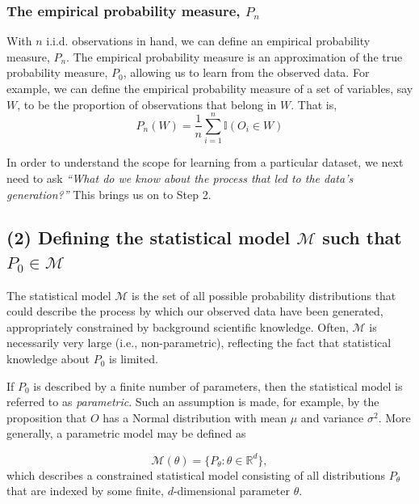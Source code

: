 \documentclass[
  12pt, krantz2,
]{krantz}
\newcommand{\R}{\mathbb{R}}
\newcommand{\M}{\mathcal{M}}
\newcommand{\I}{\mathbb{I}}
\newcommand{\1}{\mathbbm{1}}
\theoremstyle{definition}
\theoremstyle{definition}
\theoremstyle{definition}
\theoremstyle{definition}
\theoremstyle{remark}
\begin{document}
\hypertarget{the-empirical-probability-measure-p_n}{%
\subsubsection*{\texorpdfstring{The empirical probability measure, \(P_n\)}{The empirical probability measure, P\_n}}\label{the-empirical-probability-measure-p_n}}


With \(n\) i.i.d. observations in hand, we can define an empirical probability
measure, \(P_n\). The empirical probability measure is an approximation of the
true probability measure, \(P_0\), allowing us to learn from the observed data.
For example, we can define the empirical probability measure of a set of
variables, say \(W\), to be the proportion of observations that belong in \(W\).
That is,
\begin{equation*}
  P_n(W) = \frac{1}{n}\sum_{i=1}^{n} \I(O_i \in W)
\end{equation*}

In order to understand the scope for learning from a particular dataset, we next
need to ask \emph{``What do we know about the process that led to the data's
generation?''} This brings us on to Step 2.

\hypertarget{defining-the-statistical-model-m-such-that-p_0-in-m}{%
\subsection*{\texorpdfstring{(2) Defining the statistical model \(\M\) such that \(P_0 \in \M\)}{(2) Defining the statistical model \textbackslash M such that P\_0 \textbackslash in \textbackslash M}}\label{defining-the-statistical-model-m-such-that-p_0-in-m}}


The statistical model \(\M\) is the set of all possible probability distributions
that could describe the process by which our observed data have been generated,
appropriately constrained by background scientific knowledge. Often, \(\M\) is
necessarily very large (i.e., non-parametric), reflecting the fact that
statistical knowledge about \(P_0\) is limited.

If \(P_0\) is described by a finite number of parameters, then the statistical
model is referred to as \emph{parametric}. Such an assumption is made, for example,
by the proposition that \(O\) has a Normal distribution with mean \(\mu\) and
variance \(\sigma^2\). More generally, a parametric model may be defined as

\begin{equation*}
  \M(\theta) = \{P_{\theta} : \theta \in \R^d \},
\end{equation*}
which describes a constrained statistical model consisting of all distributions
\(P_{\theta}\) that are indexed by some finite, \(d\)-dimensional parameter
\(\theta\).
\end{document}
